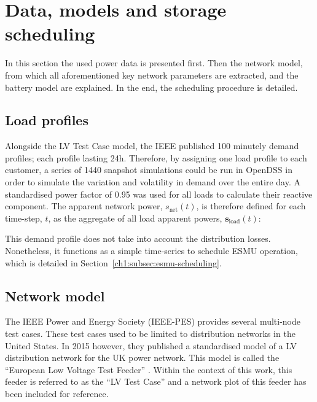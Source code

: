 \section{Data, models and storage scheduling}
\label{ch1:sec:data-and-network-models}

In this section the used power data is presented first.
Then the network model, from which all aforementioned key network parameters are extracted, and the battery model are explained.
In the end, the scheduling procedure is detailed.

\subsection{Load profiles}


Alongside the LV Test Case model, the IEEE published 100 minutely demand profiles; each profile lasting 24h.
Therefore, by assigning one load profile to each customer, a series of 1440 snapshot simulations could be run in OpenDSS in order to simulate the variation and volatility in demand over the entire day.
A standardised power factor of 0.95 was used for all loads to calculate their reactive component.
The apparent network power, $s_\text{net}(t)$, is therefore defined for each time-step, $t$, as the aggregate of all load apparent powers, $\textbf{s}_\text{load}(t)$:



This demand profile does not take into account the distribution losses.
Nonetheless, it functions as a simple time-series to schedule ESMU operation, which is detailed in Section~\ref{ch1:subsec:esmu-scheduling}.

\subsection{Network model}
\label{ch1:subsec:standardised-network-model}

The IEEE Power and Energy Society (IEEE-PES) provides several multi-node test cases.
These test cases used to be limited to distribution networks in the United States.
In 2015 however, they published a standardised model of a LV distribution network for the UK power network.
This model is called the ``European Low Voltage Test Feeder'' \cite{DistributionTestFeeders2017}.
Within the context of this work, this feeder is referred to as the ``LV Test Case'' and a network plot of this feeder has been included for reference.


